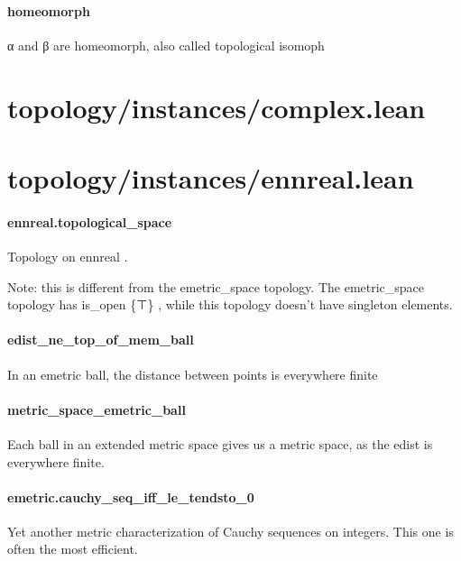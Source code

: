 \documentclass{article}
\begin{document}
\paragraph{homeomorph}
\par
α and β are homeomorph, also called topological isomoph
\section{topology/instances/complex.lean}\section{topology/instances/ennreal.lean}\paragraph{ennreal.topological\_space}
\par
Topology on 
\colorbox[RGB]{253,246,227}{{{{\color[RGB]{101, 123, 131} ennreal }}}}.
\par
Note: this is different from the 
\colorbox[RGB]{253,246,227}{{{{\color[RGB]{101, 123, 131} emetric\_space }}}} topology. The 
\colorbox[RGB]{253,246,227}{{{{\color[RGB]{101, 123, 131} emetric\_space }}}} topology has
\colorbox[RGB]{253,246,227}{{{{\color[RGB]{101, 123, 131} is\_open \{⊤\} }}}}, while this topology doesn't have singleton elements.
\paragraph{edist\_ne\_top\_of\_mem\_ball}
\par
In an emetric ball, the distance between points is everywhere finite
\paragraph{metric\_space\_emetric\_ball}
\par
Each ball in an extended metric space gives us a metric space, as the edist
is everywhere finite.
\paragraph{emetric.cauchy\_seq\_iff\_le\_tendsto\_0}
\par
Yet another metric characterization of Cauchy sequences on integers. This one is often the
most efficient.
\end{document}
